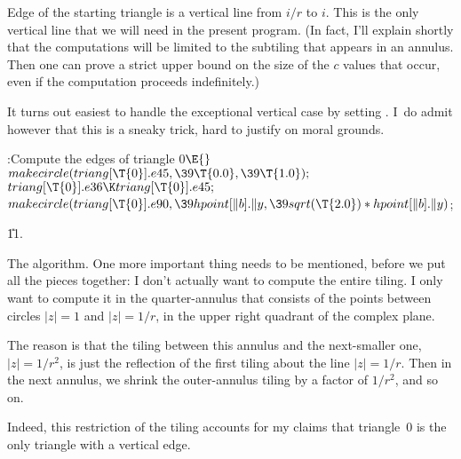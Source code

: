 Edge  of the starting triangle is a
vertical line from
$i/r$ to $i$. This is the only vertical line that we will need in
the present program. (In fact, I'll explain shortly that
the computations will be limited to the subtiling that appears
in an annulus. Then one can prove
a strict upper bound on the size of the $c$ values that occur,
even if the computation proceeds indefinitely.)

It turns out easiest to handle the exceptional vertical case by
setting . I~do admit however that this is a sneaky
trick,
hard to justify on moral grounds.

\Y\B\4:Compute the edges of triangle 0\X${}\E{}$\6
$\\{makecircle}(\\{triang}[\T{0}].\\{e45},\39\T{0.0},\39\T{1.0});{}$\6
${}\\{triang}[\T{0}].\\{e36}\K\\{triang}[\T{0}].\\{e45};{}$\6
${}\\{makecircle}(\\{triang}[\T{0}].\\{e90},\39\\{hpoint}[\|b].\|y,\39\\{sqrt}(%
\T{2.0})*\\{hpoint}[\|b].\|y){}$;\par
\U11.\fi

The algorithm. One more important thing needs to be
mentioned,
before we put all the pieces together: I don't actually
want to compute the entire tiling. I only want to compute it
in the quarter-annulus that consists of the points
between circles $\vert z\vert=1$ and $\vert z\vert=1/r$, in
the upper right quadrant of the complex plane.

The reason is that the tiling between this annulus and the
next-smaller one, $\vert z\vert=1/r^2$, is just the reflection
of the first tiling about the line $\vert z\vert=1/r$. Then in
the next annulus, we shrink the outer-annulus tiling by a factor
of $1/r^2$, and so on.

Indeed, this restriction of the tiling accounts for my claims that
triangle~0 is the only triangle with a vertical edge.

